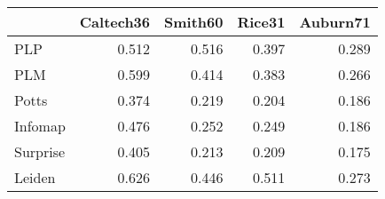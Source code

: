 \begin{tabular}{lrrrr}
\toprule
{} & Caltech36 & Smith60 & Rice31 & Auburn71 \\
\midrule
PLP      &     0.512 &   0.516 &  0.397 &    0.289 \\
PLM      &     0.599 &   0.414 &  0.383 &    0.266 \\
Potts    &     0.374 &   0.219 &  0.204 &    0.186 \\
Infomap  &     0.476 &   0.252 &  0.249 &    0.186 \\
Surprise &     0.405 &   0.213 &  0.209 &    0.175 \\
Leiden   &     0.626 &   0.446 &  0.511 &    0.273 \\
\bottomrule
\end{tabular}
